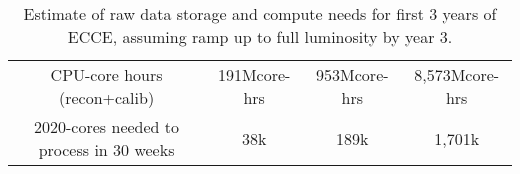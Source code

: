 \begin{table}[htb!]
\begin{tabular}{c|c|c|c}
        CPU-core hours (recon+calib)	& 191Mcore-hrs	& 953Mcore-hrs &	8,573Mcore-hrs \\
        2020-cores needed to process in 30 weeks	& 38k &	189k &	1,701k \\
        \hline
   \end{tabular}
    \caption{Estimate of raw data storage and compute needs for first 3 years of ECCE,  assuming ramp up to full luminosity by year 3. 
    }
    \label{tab:computing-integrated_luminosity_by_year}
\end{table}
